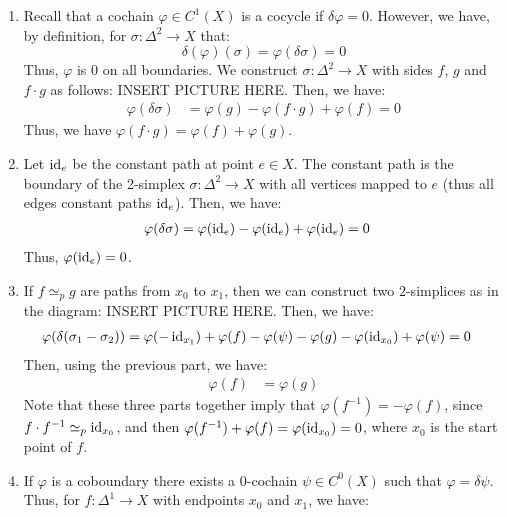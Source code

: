 \documentclass[12pt]{article}
\begin{document}
\begin{solution}
    \bbni
    \begin{enumerate}
        \item Recall that a cochain $\varphi \in C^1(X)$ is a cocycle if $\delta \varphi = 0$. However, we have, by definition, for $\sigma: \Delta^2 \to X$ that: 
        \[ \delta(\varphi)(\sigma) = \varphi(\delta \sigma) = 0\]
        Thus, $\varphi$ is $0$ on all boundaries. \bbni
        We construct $\sigma: \Delta^2 \to X$ with sides $f$, $g$ and $f \cdot g$ as follows: \bbni
        INSERT PICTURE HERE. \bbni
        Then, we have: 
        \begin{align*}
            \varphi(\delta \sigma) &= \varphi(g) - \varphi(f \cdot g) + \varphi(f) = 0
        \end{align*}
        Thus, we have $\varphi(f \cdot g) = \varphi(f) + \varphi(g)$.
        \item Let $\operatorname{id}_e$ be the constant path at point $e \in X$. The constant path is the boundary of the 2-simplex $\sigma: \Delta^2 \to X$ with all vertices mapped to $e$ (thus all edges constant paths $\operatorname{id}_{e}$). Then, we have:
        \begin{align*}
            \varphi(\delta \sigma) &= \varphi(\operatorname{id}_e) - \varphi(\operatorname{id}_e) + \varphi(\operatorname{id}_e) = 0
        \end{align*}
        Thus, $\varphi(\operatorname{id}_e) = 0$.
        \item If $f \simeq_p g$ are paths from $x_0$ to $x_1$, then we can construct two $2$-simplices as in the diagram: \bbni
        INSERT PICTURE HERE. \bbni
        Then, we have:
        \begin{align*}
            \varphi(\delta (\sigma_1 - \sigma_2)) &= \varphi(-\operatorname{id}_{x_1}) + \varphi(f) -\varphi(\psi) - \varphi(g) - \varphi(\operatorname{id}_{x_0}) +\varphi(\psi) = 0 
        \end{align*}
        Then, using the previous part, we have: 
        \begin{align*}
            \varphi(f) &= \varphi(g)
        \end{align*}
        Note that these three parts together imply that $\varphi(f^{-1}) = -\varphi(f)$, since $f \cdot f^{-1} \simeq_p \operatorname{id}_{x_0}$, and then $\varphi(f^{-1}) + \varphi(f) = \varphi(\operatorname{id}_{x_0}) = 0$, where $x_0$ is the start point of $f$.
        \item If $\varphi$ is a coboundary there exists a $0$-cochain $\psi \in C^0(X)$ such that $\varphi = \delta \psi$. Thus, for $f: \Delta^1 \to X$ with endpoints $x_0$ and $x_1$, we have:

\end{enumerate}
\end{solution}
\end{document}
